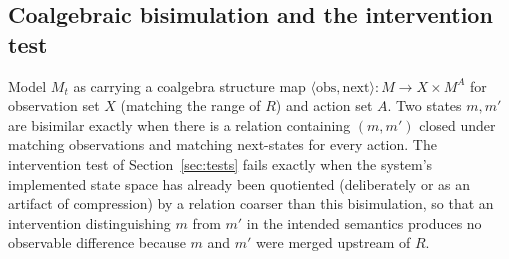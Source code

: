 \documentclass[11pt]{article}
\begin{document}
\subsection{Coalgebraic bisimulation and the intervention test}

Model $M_t$ as carrying a coalgebra structure map $\langle \mathrm{obs}, \mathrm{next} \rangle : M \to X \times M^{A}$ for observation set $X$ (matching the range of $R$) and action set $A$. Two states $m, m'$ are bisimilar exactly when there is a relation containing $(m,m')$ closed under matching observations and matching next-states for every action. The intervention test of Section~\ref{sec:tests} fails exactly when the system's implemented state space has already been quotiented (deliberately or as an artifact of compression) by a relation coarser than this bisimulation, so that an intervention distinguishing $m$ from $m'$ in the intended semantics produces no observable difference because $m$ and $m'$ were merged upstream of $R$.
\end{document}
